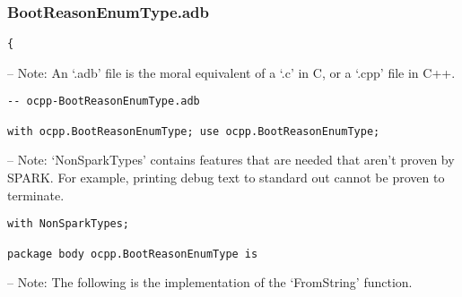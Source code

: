\documentclass[12pt,openany,a4paper]{book}
\begin{document}
\subsubsection{BootReasonEnumType.adb}
\begin{verbatim}
{
\end{verbatim} 
-- Note: An `.adb' file is the moral equivalent of a `.c' in C, or a `.cpp' file in C++.
\begin{verbatim}
-- ocpp-BootReasonEnumType.adb

with ocpp.BootReasonEnumType; use ocpp.BootReasonEnumType;
\end{verbatim} 
-- Note: `NonSparkTypes' contains features that are needed that aren't proven by SPARK. For example, printing debug text to standard out cannot be proven to terminate.
\begin{verbatim}
with NonSparkTypes;

package body ocpp.BootReasonEnumType is
\end{verbatim} 
-- Note: The following is the implementation of the `FromString' function.
\end{document}
